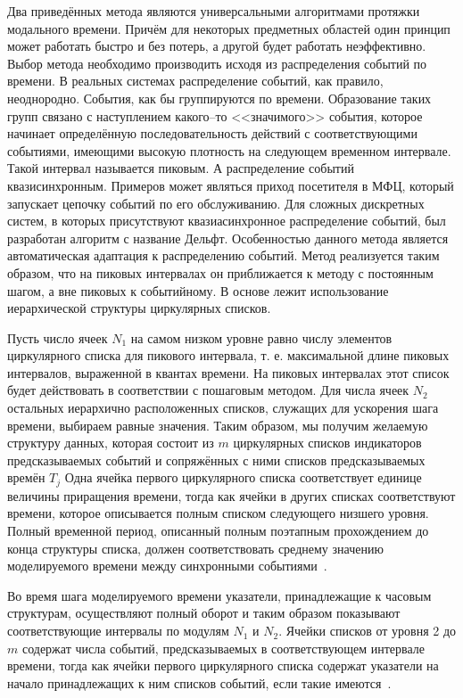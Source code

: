 Два приведённых метода являются универсальными алгоритмами протяжки модального времени. Причём для некоторых предметных областей один принцип может работать быстро и без потерь, а другой будет работать неэффективно. Выбор метода необходимо производить исходя из распределения событий по времени. В реальных системах
распределение событий, как правило, неоднородно. События, как бы группируются по времени. Образование таких групп связано с наступлением какого--то <<значимого>> события, которое начинает определённую последовательность действий с соответствующими событиями, имеющими высокую плотность на следующем временном интервале. Такой интервал называется пиковым. А распределение событий квазисинхронным. Примеров может являться приход посетителя в МФЦ, который запускает цепочку событий по его обслуживанию. Для сложных дискретных систем, в которых присутствуют квазиасинхронное распределение событий, был разработан алгоритм с название Дельфт. Особенностью данного метода является автоматическая адаптация к распределению событий. Метод реализуется таким образом, что на пиковых интервалах он приближается к методу с постоянным шагом, а вне
пиковых к событийному. В основе лежит использование иерархической структуры циркулярных списков. 

Пусть число ячеек  $N_1$ на самом низком уровне равно числу элементов циркулярного списка для пикового  интервала, т. е. максимальной длине пиковых интервалов, выраженной в квантах времени. На пиковых интервалах этот список будет действовать в соответствии с пошаговым  методом. Для числа ячеек  $N_2$ остальных иерархично расположенных списков, служащих для ускорения шага времени, выбираем равные значения. Таким образом, мы получим желаемую структуру данных, которая состоит из $m$ циркулярных списков индикаторов предсказываемых событий и сопряжённых с ними списков предсказываемых времён $T_j$ Одна ячейка первого циркулярного списка соответствует единице величины приращения времени, тогда как ячейки в  других списках соответствуют времени, которое описывается полным списком следующего низшего уровня. Полный временной период, описанный полным поэтапным прохождением до конца структуры списка, должен соответствовать среднему значению моделируемого времени между синхронными событиями~\cite{delft}.

Во время шага  моделируемого времени указатели,  принадлежащие к часовым  структурам, осуществляют полный оборот и таким образом показывают соответствующие интервалы по модулям $N_1$ и $N_2$. Ячейки списков от уровня 2 до $m$ содержат числа событий, предсказываемых в соответствующем интервале  времени, тогда как ячейки первого циркулярного списка содержат указатели на начало принадлежащих к ним списков событий, если такие имеются~\cite{delft}.

